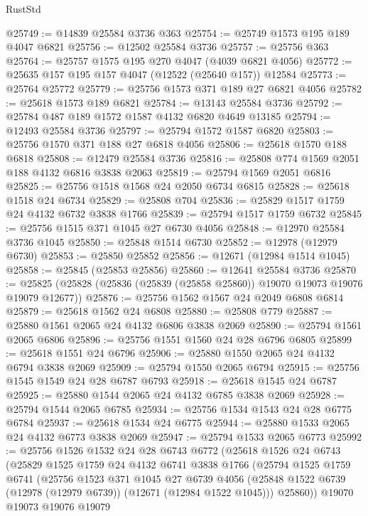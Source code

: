 \begin{lexlean}{RustStd}
\begin{coremodule}
@25749 := @14839 @25584 @3736 @363
@25754 := @25749 @1573 @195 @189 @4047 @6821
@25756 := @12502 @25584 @3736
@25757 := @25756 @363
@25764 := @25757 @1575 @195 @270 @4047 (@4039 @6821 @4056)
@25772 := @25635 @157 @195 @157 @4047 (@12522 (@25640 @157)) @12584
@25773 := @25764 @25772
@25779 := @25756 @1573 @371 @189 @27 @6821 @4056
@25782 := @25618 @1573 @189 @6821
@25784 := @13143 @25584 @3736
@25792 := @25784 @487 @189 @1572 @1587 @4132 @6820 @4649 @13185
@25794 := @12493 @25584 @3736
@25797 := @25794 @1572 @1587 @6820
@25803 := @25756 @1570 @371 @188 @27 @6818 @4056
@25806 := @25618 @1570 @188 @6818
@25808 := @12479 @25584 @3736
@25816 := @25808 @774 @1569 @2051 @188 @4132 @6816 @3838 @2063
@25819 := @25794 @1569 @2051 @6816
@25825 := @25756 @1518 @1568 @24 @2050 @6734 @6815
@25828 := @25618 @1518 @24 @6734
@25829 := @25808 @704
@25836 := @25829 @1517 @1759 @24 @4132 @6732 @3838 @1766
@25839 := @25794 @1517 @1759 @6732
@25845 := @25756 @1515 @371 @1045 @27 @6730 @4056
@25848 := @12970 @25584 @3736 @1045
@25850 := @25848 @1514 @6730
@25852 := @12978 (@12979 @6730)
@25853 := @25850 @25852
@25856 := @12671 (@12984 @1514 @1045)
@25858 := @25845 (@25853 @25856)
@25860 := @12641 @25584 @3736
@25870 := @25825 (@25828 (@25836 (@25839 (@25858 @25860)) @19070 @19073 @19076 @19079 @12677))
@25876 := @25756 @1562 @1567 @24 @2049 @6808 @6814
@25879 := @25618 @1562 @24 @6808
@25880 := @25808 @779
@25887 := @25880 @1561 @2065 @24 @4132 @6806 @3838 @2069
@25890 := @25794 @1561 @2065 @6806
@25896 := @25756 @1551 @1560 @24 @28 @6796 @6805
@25899 := @25618 @1551 @24 @6796
@25906 := @25880 @1550 @2065 @24 @4132 @6794 @3838 @2069
@25909 := @25794 @1550 @2065 @6794
@25915 := @25756 @1545 @1549 @24 @28 @6787 @6793
@25918 := @25618 @1545 @24 @6787
@25925 := @25880 @1544 @2065 @24 @4132 @6785 @3838 @2069
@25928 := @25794 @1544 @2065 @6785
@25934 := @25756 @1534 @1543 @24 @28 @6775 @6784
@25937 := @25618 @1534 @24 @6775
@25944 := @25880 @1533 @2065 @24 @4132 @6773 @3838 @2069
@25947 := @25794 @1533 @2065 @6773
@25992 := @25756
    @1526
    @1532
    @24
    @28
    @6743
    @6772
    (@25618
      @1526
      @24
      @6743
      (@25829
        @1525
        @1759
        @24
        @4132
        @6741
        @3838
        @1766
        (@25794
          @1525
          @1759
          @6741
          (@25756
            @1523
            @371
            @1045
            @27
            @6739
            @4056
            (@25848 @1522 @6739 (@12978 (@12979 @6739)) (@12671 (@12984 @1522 @1045)))
            @25860))
        @19070
        @19073
        @19076
        @19079

\end{coremodule}
\end{lexlean}
